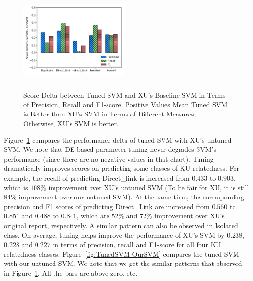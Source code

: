 \documentclass[sigconf]{acmart}
\theoremstyle{break}
\newcommand{\fig}[1]{Figure~\ref{fig:#1}}
\begin{document}
 \begin{figure}[!t]
    \centering
     \includegraphics[width=0.49\textwidth,height=2.1in]{pic/TunedSVM-SVM.pdf} %
    \caption{Score Delta between Tuned SVM and XU's Baseline SVM in Terms of Precision, Recall and F1-score. Positive Values Mean
            Tuned SVM is Better than XU's SVM in Terms of Different Measures; Otherwise, XU's SVM is better.}
    \label{fig:TunedSVM-SVM}
\end{figure}

 
\fig{TunedSVM-SVM} compares the performance delta of tuned SVM with XU's untuned SVM.
 We note that DE-based parameter tuning never degrades SVM's performance
 (since there are no negative values in that chart). 
 Tuning dramatically improves scores on predicting some classes of KU relatedness. 
 For example, the {recall} of predicting {Direct\_link} is increased 
 from $0.433$ to $0.903$, which is $108\%$ improvement over XU's untuned SVM
 (To be fair for XU, it is still $84\%$ improvement over our untuned SVM).
 At the same time, the corresponding {precision} and {F1} scores of predicting {Direct\_Link} 
 are increased from $0.560$ to $0.851$ and $0.488$ to $0.841$, 
which are $52\%$ and $72\%$ improvement over XU's original report\cite{xu2016predicting}, respectively. 
 A similar pattern can also be observed in {Isolated} class. On average, tuning helps improve the performance
of XU's SVM by $0.238$, $0.228$ and $0.227$ in terms of {precision}, {recall} and {F1-score}
for all four KU relatedness classes. \fig{TunedSVM-OurSVM} compares the tuned SVM with our untuned SVM. We note that we get 
the similar patterns that observed in \fig{TunedSVM-SVM}. All the bars are above zero, etc.

\end{document}
